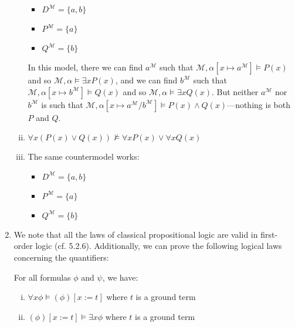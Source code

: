 \begin{enumerate}[\thesection.1]
\begin{enumerate}[(i)]
\begin{itemize}
			\item $D^\mathcal{M}=\{a,b\}$
			
			\item $P^\mathcal{M}=\{a\}$
			\item $Q^\mathcal{M}=\{b\}$
		
		\end{itemize}
		
		In this model, there we can find $a^\mathcal{M}$ such that $\mathcal{M},\alpha[x\mapsto a^\mathcal{M}]\vDash P(x)$ and so $\mathcal{M},\alpha\vDash\exists x P(x)$, and we can find $b^\mathcal{M}$ such that $\mathcal{M},\alpha[x\mapsto b^\mathcal{M}]\vDash Q(x)$ and so $\mathcal{M},\alpha\vDash\exists x Q(x)$. But neither $a^\mathcal{M}$ nor $b^\mathcal{M}$ is such that $\mathcal{M},\alpha[x\mapsto a^\mathcal{M}/b^\mathcal{M}]\vDash P(x)\land Q(x)$---nothing is both $P$ and $Q$. 
		
		\item $\forall x(P(x)\lor Q(x))\nvDash \forall xP(x)\lor \forall xQ(x)$

	\item[] The same countermodel works:
		
		\begin{itemize}
		
			\item $D^\mathcal{M}=\{a,b\}$
			
			\item $P^\mathcal{M}=\{a\}$
			\item $Q^\mathcal{M}=\{b\}$
		
		\end{itemize}


\end{enumerate}
		
		
		\item We note that all the laws of classical propositional logic are valid in first-order logic (cf. 5.2.6). Additionally, we can prove the following logical laws concerning the quantifiers:
				
		\begin{proposition} For all formulas $\phi$ and $\psi$, we have:
		
		\begin{enumerate}[(i)]
		
		\item $\forall x\phi\vDash(\phi)[x:=t]$  where $t$ is a ground term
%		
		\item $(\phi)[x:=t]\vDash\exists x\phi$ where $t$ is a ground term


\end{enumerate}
\end{proposition}
\end{enumerate}
